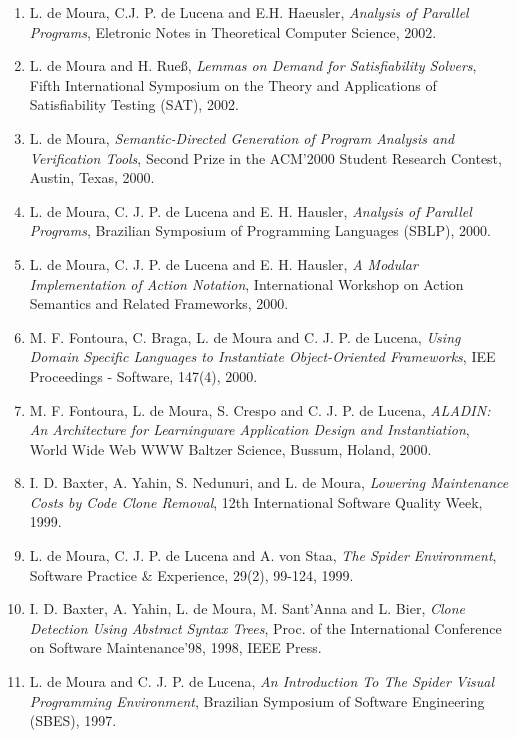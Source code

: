 \documentclass{article}
\begin{document}
\begin{enumerate}
\item L. de Moura, C.J. P. de Lucena and E.H. Haeusler,
{\em Analysis of Parallel Programs},
Eletronic Notes in Theoretical Computer Science, 2002.

\item L. de Moura and H. Rue\ss,
{\em Lemmas on Demand for Satisfiability Solvers},
Fifth  International Symposium on the Theory and Applications of Satisfiability Testing (SAT), 2002.

\item L. de Moura,
{\em Semantic-Directed Generation of Program Analysis and Verification Tools},
Second Prize in the ACM'2000 Student Research Contest, Austin, Texas, 2000.

\item L. de Moura, C. J. P. de Lucena and E. H. Hausler,
{\em Analysis of Parallel Programs},
Brazilian Symposium of Programming Languages (SBLP), 2000.

\item L. de Moura, C. J. P. de Lucena and E. H. Hausler,
{\em A Modular Implementation of Action Notation},
International Workshop on Action Semantics and Related Frameworks, 2000.

\item M. F. Fontoura, C. Braga, L. de Moura and C. J. P. de Lucena,
{\em Using Domain Specific Languages to Instantiate Object-Oriented Frameworks},
IEE Proceedings - Software, 147(4), 2000.

\item M. F. Fontoura, L. de Moura, S. Crespo and C. J. P. de Lucena,
{\em ALADIN: An Architecture for Learningware Application Design and Instantiation},
World Wide Web WWW Baltzer Science, Bussum, Holand, 2000.

\item I. D. Baxter, A. Yahin, S. Nedunuri, and L. de Moura,
{\em Lowering Maintenance Costs by Code Clone Removal},
12th International Software Quality Week, 1999.

\item L. de Moura, C. J. P. de Lucena and A. von Staa,
{\em The Spider Environment},
Software Practice \& Experience, 29(2), 99-124, 1999.

\item I. D. Baxter, A. Yahin, L. de Moura, M. Sant'Anna and L. Bier,
{\em Clone Detection Using Abstract Syntax Trees},
Proc. of the International Conference on Software Maintenance'98, 1998, IEEE Press.

\item L. de Moura and C. J. P. de Lucena,
{\em An Introduction To The Spider Visual Programming Environment},
Brazilian Symposium of Software Engineering (SBES), 1997.


\end{enumerate}
\end{document}
